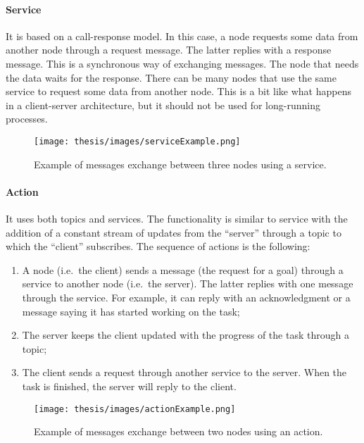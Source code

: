 \documentclass[../thesis.tex]{subfiles}
\begin{document}
\paragraph{Service}
It is based on a call-response model. In this case, a node requests some data from another node through a request message. The latter replies with a response message. This is a synchronous way of exchanging messages. The node that needs the data waits for the response. There can be many nodes that use the same service to request some data from another node. This is a bit like what happens in a client-server architecture, but it should not be used for long-running processes. 
\begin{figure}[H]
    \centering
    \texttt{[image: thesis/images/serviceExample.png]}
    \caption{Example of messages exchange between three nodes using a service.}
    \label{fig:exampleServiceExchangeMessage}
\end{figure}

\paragraph{Action}\label{p:exchange_message_with_actions}
It uses both topics and services. The functionality is similar to service with the addition of a constant stream of updates from the ``server'' through a topic to which the ``client'' subscribes. The sequence of actions is the following: 
    \begin{enumerate}
        \item A node (i.e.\ the client) sends a message (the request for a goal) through a service to another node  (i.e.\ the server). The latter replies with one message through the service. For example, it can reply with an acknowledgment or a message saying it has started working on the task; 
        \item The server keeps the client updated with the progress of the task through a topic; 
        \item The client sends a request through another service to the server. When the task is finished, the server will reply to the client. 
    \end{enumerate}
\begin{figure}[H]
    \centering
    \texttt{[image: thesis/images/actionExample.png]}
    \caption{Example of messages exchange between two nodes using an action.}
    \label{fig:exampleActionExchangeMessage}
\end{figure}
\end{document}
